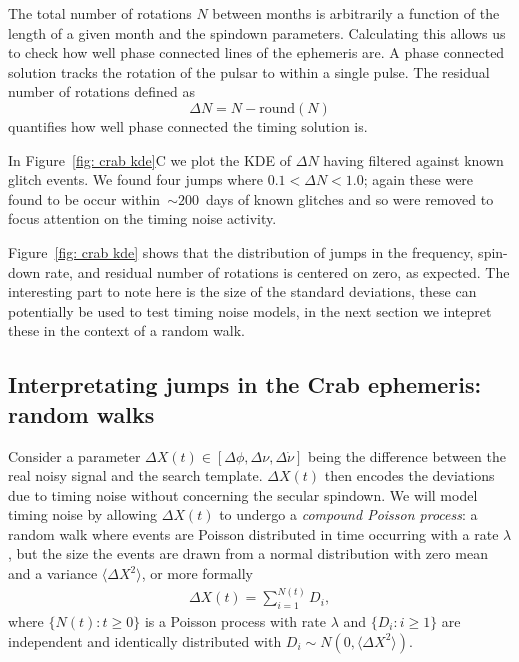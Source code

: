 \documentclass[../full_thesis/full_thesis.tex]{subfiles}
\begin{document}
\begin{subappendices}
The total number of rotations $N$ between months is arbitrarily a function of
the length of a given month and the spindown parameters. Calculating this
allows us to check how well phase connected lines of the ephemeris are. A phase
connected solution tracks the rotation of the pulsar to within a single pulse.
The residual number of rotations defined as
\begin{equation}
\Delta N = N - \textrm{round}(N)
\end{equation}
quantifies how well phase connected the timing solution is.

In Figure~\ref{fig: crab kde}C we plot the KDE of $\Delta N$ having filtered
against known glitch events. We found four jumps where $0.1 < \Delta N < 1.0$;
again these were found to be occur within~$\sim200$~days of known glitches and
so were removed to focus attention on the timing noise activity.

Figure~\ref{fig: crab kde} shows that the distribution of jumps in the frequency,
spin-down rate, and residual number of rotations is centered on zero, as
expected. The interesting part to note here is the size of the standard deviations,
these can potentially be used to test timing noise models, in the next section
we intepret these in the context of a random walk.

\subsection{Interpretating jumps in the Crab ephemeris: random walks}
\label{sec: physical interpretation of the monthly ephemeris}

Consider a parameter $\Delta X(t) \in [\Delta\phi, \Delta\nu,\Delta\dot{\nu}]$ being
the difference between the real noisy signal and the search template. $\Delta
X(t)$ then encodes the deviations due to timing noise without concerning the
secular spindown.  We will model timing noise by allowing $\Delta X(t)$ to
undergo a \emph{compound Poisson process}: a random walk where events are
Poisson distributed in time occurring with a rate $\lambda$, but the size the
events are drawn from a normal distribution with zero mean and a variance
$\langle \Delta X^{2} \rangle$, or more formally
\begin{align}
\Delta X(t) = \sum_{i=1}^{N(t)} D_i,
\end{align}
where $\{ N(t): t \ge 0\}$ is a Poisson process with rate $\lambda$ and
$\{D_i: i \ge 1\}$ are independent and identically distributed with 
$D_i \sim N(0, \langle\Delta X^{2}\rangle)$.


\end{subappendices}
\end{document}
